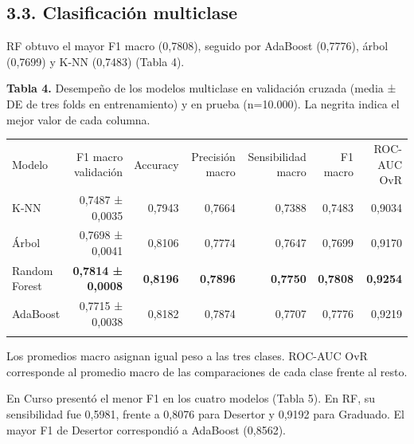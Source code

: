 \documentclass[10pt,a4paper]{article}
\newenvironment{tabla}{\par\begingroup\small
  \setlength{\LTpre}{2pt}\setlength{\LTpost}{2pt}\setlength{\tabcolsep}{4.5pt}
  \renewcommand{\arraystretch}{1.08}}{\endgroup\par}
\newcommand{\epigrafetabla}[1]{\noindent\begin{minipage}{\linewidth}\small\justifying\noindent #1\end{minipage}\par\vspace{2pt}}
\newcommand{\notatabla}[1]{\vspace{3pt}\noindent\begin{minipage}{\linewidth}\footnotesize\justifying\noindent #1\end{minipage}\par}
\renewcommand{\toprule}{\specialrule{1pt}{2pt}{2pt}}
\renewcommand{\bottomrule}{\specialrule{1pt}{2pt}{0pt}}
\renewcommand{\midrule}{\specialrule{.5pt}{2pt}{2pt}}
\begin{document}
\hypertarget{clasificaciuxf3n-multiclase}{%
\subsection{3.3. Clasificación multiclase}\label{clasificaciuxf3n-multiclase}}

RF obtuvo el mayor F1 macro (0,7808), seguido por AdaBoost (0,7776), árbol (0,7699) y K-NN (0,7483) (Tabla 4).

\begin{table}[!htbp]
\begin{tabla}
\epigrafetabla{\textbf{Tabla 4.} Desempeño de los modelos multiclase en validación
cruzada (media ± DE de tres folds en entrenamiento) y en prueba
(n=10.000). La negrita indica el mejor valor de cada columna.}
\begin{tabular*}{\linewidth}{@{\extracolsep{\fill}}lrrrrrr@{}}
\toprule\noalign{}
Modelo & F1 macro validación & Accuracy & Precisión macro & Sensibilidad
macro & F1 macro & ROC-AUC OvR \\
\midrule\noalign{}
K-NN & 0,7487 ± 0,0035 & 0,7943 & 0,7664 & 0,7388 & 0,7483 & 0,9034 \\
Árbol & 0,7698 ± 0,0041 & 0,8106 & 0,7774 & 0,7647 & 0,7699 & 0,9170 \\
Random Forest & \textbf{0,7814 ± 0,0008} & \textbf{0,8196} &
\textbf{0,7896} & \textbf{0,7750} & \textbf{0,7808} & \textbf{0,9254} \\
AdaBoost & 0,7715 ± 0,0038 & 0,8182 & 0,7874 & 0,7707 & 0,7776 &
0,9219 \\
\bottomrule
\end{tabular*}
\notatabla{Los promedios macro asignan igual peso a las tres clases. ROC-AUC OvR
corresponde al promedio macro de las comparaciones de cada clase frente
al resto.}
\end{tabla}
\end{table}

En Curso presentó el menor F1 en los cuatro modelos (Tabla 5). En RF, su sensibilidad fue 0,5981, frente a 0,8076 para Desertor y 0,9192 para
Graduado. El mayor F1 de Desertor correspondió a AdaBoost (0,8562).
\end{document}
